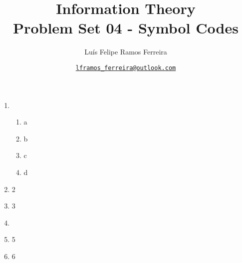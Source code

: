 \documentclass{article}
\title{Information Theory \\ \large Problem Set 04 - Symbol Codes}
\author{Luís Felipe Ramos Ferreira}
\date{\href{mailto:lframos\_ferreira@outlook.com}{\texttt{lframos\_ferreira@outlook.com}}
}
\begin{document}
\maketitle

\begin{enumerate}
	\item \begin{enumerate}
		      \item a
		      \item b
		      \item c
		      \item d
	      \end{enumerate}

	\item 2
	\item 3
	\item \begin{enumerate}

	      \end{enumerate}
	\item 5
	\item 6
\end{enumerate}
\end{document}
